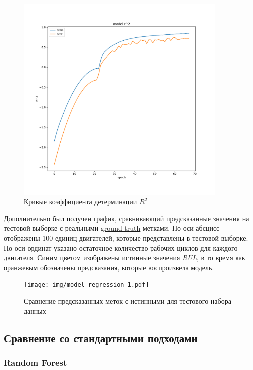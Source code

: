 \documentclass[14pt]{extarticle}
\begin{document}
\begin{figure}
	\centering
	\includegraphics[width=0.9\textwidth]{img/model_r2.pdf}
	\caption{Кривые коэффициента детерминации $R^2$}
	\label{fig:test_r2}
\end{figure}

\newpage

Дополнительно был получен график, сравнивающий предсказанные значения на тестовой выборке с реальными \hyperref[glossary]{ground truth} метками. По оси абсцисс отображены 100 единиц двигателей, которые представлены в тестовой выборке. По оси ординат указано остаточное количество рабочих циклов для каждого двигателя. Синим цветом изображены истинные значения {\it RUL}, в то время как оранжевым обозначены предсказания, которые воспроизвела модель.

\begin{figure}[h]
	\centering
	\texttt{[image: img/model\_regression\_1.pdf]}
	\caption{Сравнение предсказанных меток с истинными для тестового набора данных}
	\label{fig:test_regression}
\end{figure}


\subsection{Сравнение со стандартными подходами}

\subsubsection{Random Forest}
\end{document}
